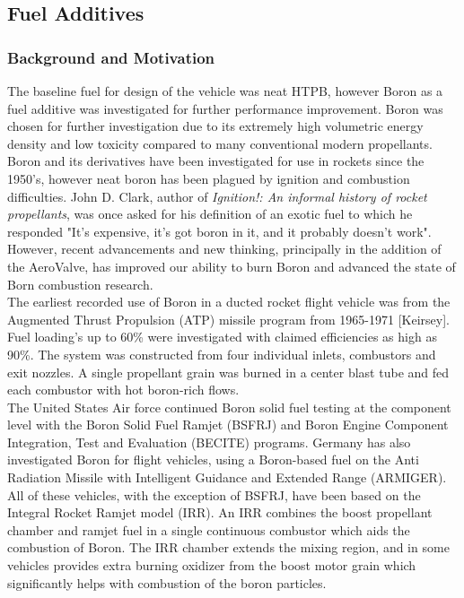 \subsection{Fuel Additives} 
\subsubsection{Background and Motivation}
The baseline fuel for design of the vehicle was neat HTPB, however Boron as a fuel additive was investigated for further performance improvement. Boron was chosen for further investigation due to its extremely high volumetric energy density and low toxicity compared to many conventional modern propellants. \\ \indent
Boron and its derivatives have been investigated for use in rockets since the 1950's, however neat boron has been plagued by ignition and combustion difficulties. John D. Clark, author of \textit{Ignition!: An informal history of rocket propellants}, was once asked for his definition of an exotic fuel to which he responded "It's expensive, it's got boron in it, and it probably doesn't work". However, recent advancements and new thinking, principally in the addition of the AeroValve, has improved our ability to burn Boron and advanced the state of Born combustion research. \\ \indent
The earliest recorded use of Boron in a ducted rocket flight vehicle was from the Augmented Thrust Propulsion (ATP) missile program from 1965-1971 [Keirsey]. Fuel loading's up to 60\% were investigated with claimed efficiencies as high as 90\%. The system was constructed from four individual inlets, combustors and exit nozzles. A single propellant grain was burned in a center blast tube and fed each combustor with hot boron-rich flows. 
\\ \indent
The United States Air force continued Boron solid fuel testing at the component level with the Boron Solid Fuel Ramjet (BSFRJ) and Boron Engine Component Integration, Test and Evaluation (BECITE) programs. Germany has also investigated Boron for flight vehicles, using a Boron-based fuel on the Anti Radiation Missile with Intelligent Guidance and Extended Range (ARMIGER). All of these vehicles, with the exception of BSFRJ, have been based on the Integral Rocket Ramjet model (IRR). An IRR combines the boost propellant chamber and ramjet fuel in a single continuous combustor which aids the combustion of Boron. The IRR chamber extends the mixing region, and in some vehicles provides extra burning oxidizer from the boost motor grain which significantly helps with combustion of the boron particles. \\ \indent
